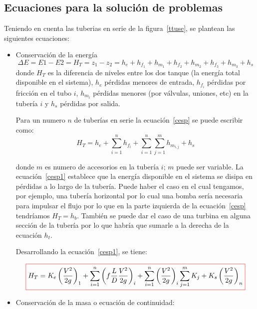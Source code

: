 \documentclass[11pt, oneside]{article}
\begin{document}
\subsection{Ecuaciones para la soluci\'on de problemas}
Teniendo en cuenta las tuberias en serie de la figura~\ref{ttuse}, se plantean las siguientes ecuaciones:
\begin{itemize}
\item Conservaci\'on de la energ\'ia
\begin{equation}
\Delta E = E1-E2 = H_T = z_1 - z_2 = h_e + h_{f_1} + h_{m_1} + h_{f_2} + h_{m_2} + h_{f_3} + h_{m_3} + h_s
\label{cesp}
\end{equation}
donde $H_T$ es la diferencia de niveles entre los dos tanque (la energ\'ia total disponible en el sistema), $h_e$ p\'erdidas menores de entrada, $h_{f_i}$ p\'erdidas por fricci\'on en el tubo $i$, $h_{m_i}$ p\'erdidas menores (por v\'alvulas, uniones, etc) en la tuber\'ia $i$ y $h_s$ p\'erdidas por salida.

Para un numero $n$ de tuber\'ias en serie la ecuaci\'on~\ref{cesp} se puede escribir como:
\begin{equation}
H_T = h_e + \sum_{i=1}^{n} h_{f_i} + \sum_{i=1}^{n} \sum_{j=1}^{m} h_{m_{i,j}} + h_s 
\label{cesp1}
\end{equation}

donde $m$ es numero de accesorios en la tuber\'ia $i$; $m$ puede ser variable. La ecuaci\'on~\ref{cesp1} establece que la energ\'ia disponible en el sistema se disipa en p\'erdidas a lo largo de la tuber\'ia. Puede haber el caso en el cual tengamos, por ejemplo, una tuber\'ia horizontal por lo cual una bomba ser\'ia necesaria para impulsar el flujo por lo que en la parte izquierda de la ecuaci\'on~\ref{cesp} tendr\'iamos $H_T=h_b$. Tambi\'en se puede dar el caso de una turbina en alguna secci\'on de la tuber\'ia por lo que habr\'ia que sumarle a la derecha de la ecuaci\'on $h_t$.

Desarrollando la ecuaci\'on~\ref{cesp1}, se tiene:

\begin{equation}
\color{red}\boxed{\color{black} H_T = K_e \left( \frac{V^2}{2g} \right)_1 + \sum_{i=1}^{n} \left( f\frac{L}{D}\frac{V^2}{2g} \right)_i + \sum_{i=1}^{n} \left(\frac{V^2}{2g}\right)_i \sum_{j=1}^{m} K_j + K_s \left( \frac{V^2}{2g} \right)_n }
\label{cesp2}
\end{equation}

\item Conservaci\'on de la masa o ecuaci\'on de continuidad:


\end{itemize}
\end{document}

